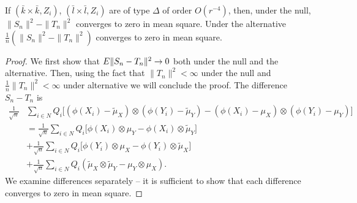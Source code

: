 \begin{lemma}
\label{lem:difS_nT_n}
 If $(\bar k \times \bar k,Z_i)$, $(\bar l \times \bar l,Z_i)$  are of type $\varDelta$ of order $O(r^{-4})$, then, under the null,  $\|S_n\|^2- \|T_n\|^2$  converges to zero in mean square. Under the alternative $\frac 1 n (\|S_n\|^2- \|T_n\|^2) $ converges to zero in  mean square.
\end{lemma}
\begin{proof}
We first show that $E \| S_n- T_n\|^2 \to 0$ both under the null and the alternative. Then,  using the fact that $\|T_n\|^2< \infty$ under the null  and $\frac 1 n \|T_n\|^2< \infty $ under alternative we  will conclude the proof. The difference $S_n- T_n$ is 
\begin{align*}
 \frac {1} { \sqrt n} &\sum_{i \in N}Q_i \bigg[ (\phi(X_i) - \tilde \mu_X ) \otimes (\phi(Y_i )  - \tilde \mu_Y) - ( \phi(X_i) -  \mu_X ) \otimes(\phi(Y_i )  -  \mu_Y)\bigg] \\
&= \frac {1} { \sqrt n} \sum_{i \in N} Q_i \bigg[    \phi(X_i)  \otimes   \mu_Y -\phi(X_i) \otimes \tilde \mu_Y \bigg]  \\
&+\frac {1} { \sqrt n} \sum_{i \in N} Q_i \bigg[    \phi(Y_i)  \otimes   \mu_X -\phi(Y_i) \otimes \tilde \mu_X \bigg] \\
&+\frac {1} { \sqrt n} \sum_{i \in N}Q_i  ( \tilde  \mu_X   \otimes \tilde \mu_Y - \mu_Y \otimes \mu_X).
\end{align*}
We  examine differences separately -- it is sufficient to show that each difference converges to zero in mean square. 


\end{proof}
